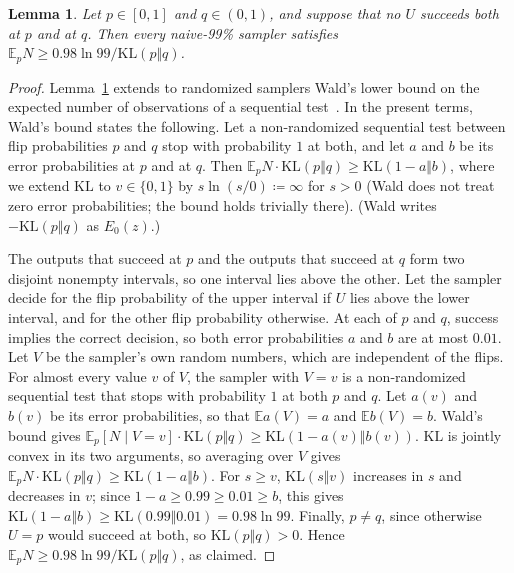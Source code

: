 \documentclass[10pt]{article}
\newtheorem{lemma}{Lemma}
\newcommand{\EE}{\mathbb{E}}
\begin{document}
\begin{lemma}\label{lem:wald}
Let $p\in[0,1]$ and $q\in(0,1)$, and suppose that no $U$
succeeds both at $p$ and at $q$. Then every naive-99\% sampler satisfies
$\EE_pN\ge0.98\ln99/\mathrm{KL}(p\Vert q)$.
\end{lemma}
\begin{proof}
Lemma~\ref{lem:wald} extends to randomized samplers Wald's lower bound on
the expected number of observations of a sequential
test~\citep[Section~4.7, eq.~(4.80)]{wald-1945}. In the present terms,
Wald's bound states the following. Let a non-randomized sequential test
between flip probabilities $p$ and $q$ stop with probability $1$ at both,
and let $a$ and $b$ be its error probabilities at $p$ and at $q$. Then
$\EE_pN\cdot\mathrm{KL}(p\Vert q)\ge\mathrm{KL}(1-a\Vert b)$, where
we extend $\mathrm{KL}$ to $v\in\{0,1\}$ by $s\ln(s/0)\coloneqq\infty$ for
$s>0$ (Wald does not treat zero error probabilities; the bound holds trivially there). (Wald writes $-\mathrm{KL}(p\Vert q)$ as $E_0(z)$.)

The outputs that succeed at
$p$ and the outputs that succeed at $q$ form two disjoint nonempty intervals,
so one interval lies above the other. Let the sampler decide for the flip
probability of the upper interval if $U$ lies above the lower interval, and
for the other flip probability otherwise. At each of $p$ and $q$, success
implies the correct decision, so both error probabilities $a$ and $b$ are at
most $0.01$. Let $V$ be the sampler's own random numbers, which are
independent of the flips. For almost every value $v$ of $V$, the sampler with
$V=v$ is a non-randomized sequential test that stops with probability $1$ at
both $p$ and $q$. Let $a(v)$ and $b(v)$ be its error probabilities, so that
$\EE a(V)=a$ and $\EE b(V)=b$. Wald's bound gives
$\EE_p[N\mid V=v]\cdot\mathrm{KL}(p\Vert q)\ge\mathrm{KL}(1-a(v)\Vert b(v))$.
$\mathrm{KL}$ is jointly convex in its two arguments, so averaging over $V$
gives $\EE_pN\cdot\mathrm{KL}(p\Vert q)\ge\mathrm{KL}(1-a\Vert b)$. For
$s\ge v$, $\mathrm{KL}(s\Vert v)$ increases in $s$ and decreases in $v$; since
$1-a\ge0.99\ge0.01\ge b$, this gives
$\mathrm{KL}(1-a\Vert b)\ge\mathrm{KL}(0.99\Vert0.01)=0.98\ln99$. Finally,
$p\ne q$, since otherwise $U=p$ would succeed at both, so
$\mathrm{KL}(p\Vert q)>0$. Hence
$\EE_pN\ge0.98\ln99/\mathrm{KL}(p\Vert q)$, as claimed.
\end{proof}
\end{document}
